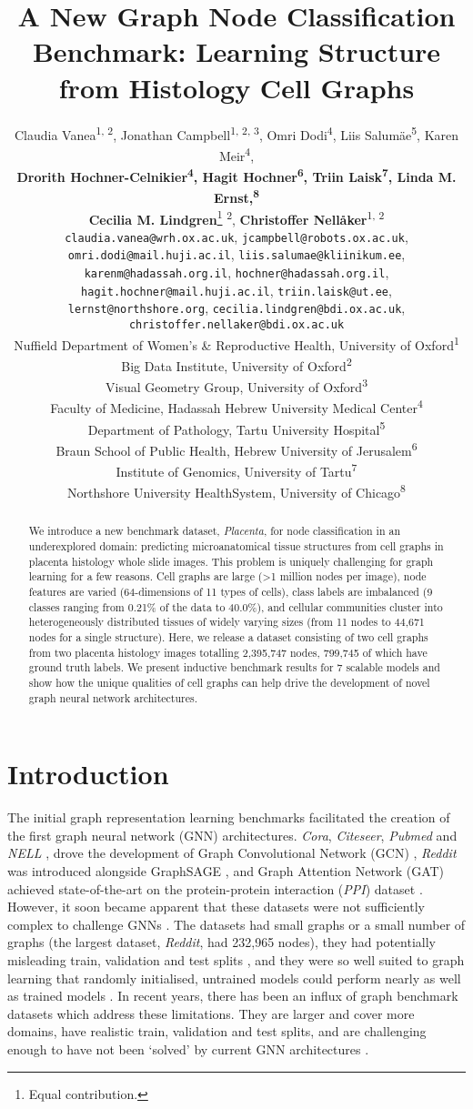 \documentclass{article}
\title{A New Graph Node Classification Benchmark: Learning Structure from Histology Cell Graphs}
\author{Claudia Vanea\textsuperscript{1, 2}, 
  Jonathan Campbell\textsuperscript{1, 2, 3}, 
  Omri Dodi\textsuperscript{4}, 
  Liis Salumäe\textsuperscript{5}, 
  Karen Meir\textsuperscript{4},\\
  \textbf{Drorith Hochner-Celnikier\textsuperscript{4}, 
  Hagit Hochner\textsuperscript{6}, 
  Triin Laisk\textsuperscript{7}, 
  Linda M. Ernst,\textsuperscript{8}}\\
  \textbf{Cecilia M. Lindgren}\thanks{Equal contribution.}  \textsuperscript{2}, 
  \textbf{Christoffer Nellåker}\footnotemark[1]  \textsuperscript{1, 2}\\
  \texttt{claudia.vanea@wrh.ox.ac.uk}, 
  \texttt{jcampbell@robots.ox.ac.uk},\\
  \texttt{omri.dodi@mail.huji.ac.il},
  \texttt{liis.salumae@kliinikum.ee},\\ 
  \texttt{karenm@hadassah.org.il}, 
  \texttt{hochner@hadassah.org.il},\\
  \texttt{hagit.hochner@mail.huji.ac.il}, 
  \texttt{triin.laisk@ut.ee},\\
  \texttt{lernst@northshore.org},
  \texttt{cecilia.lindgren@bdi.ox.ac.uk},\\
  \texttt{christoffer.nellaker@bdi.ox.ac.uk}\\
  Nuffield Department of Women's \& Reproductive Health, University of Oxford\textsuperscript{1}\\
  Big Data Institute, University of Oxford\textsuperscript{2}\\
  Visual Geometry Group, University of Oxford\textsuperscript{3}\\
  Faculty of Medicine, Hadassah Hebrew University Medical Center\textsuperscript{4}\\
  Department of Pathology, Tartu University Hospital\textsuperscript{5}\\
  Braun School of Public Health, Hebrew University of Jerusalem\textsuperscript{6}\\
  Institute of Genomics, University of Tartu\textsuperscript{7}\\
  Northshore University HealthSystem, University of Chicago\textsuperscript{8}
}
\begin{document}
\maketitle


\begin{abstract}
We introduce a new benchmark dataset, \emph{Placenta}, for node classification in an underexplored domain: predicting microanatomical tissue structures from cell graphs in placenta histology whole slide images. This problem is uniquely challenging for graph learning for a few reasons. Cell graphs are large (>1 million nodes per image), node features are varied (64-dimensions of 11 types of cells), class labels are imbalanced (9 classes ranging from 0.21\% of the data to 40.0\%), and cellular communities cluster into heterogeneously distributed tissues of widely varying sizes (from 11 nodes to 44,671 nodes for a single structure). Here, we release a dataset consisting of two cell graphs from two placenta histology images totalling 2,395,747 nodes, 799,745 of which have ground truth labels. We present inductive benchmark results for 7 scalable models and show how the unique qualities of cell graphs can help drive the development of novel graph neural network architectures.
\end{abstract}


\section{Introduction}

The initial graph representation learning benchmarks facilitated the creation of the first graph neural network (GNN) architectures. \emph{Cora}, \emph{Citeseer}, \emph{Pubmed} and \emph{NELL} \cite{yang_revisiting_2016}, \cite{carlson_toward_2010} drove the development of Graph Convolutional Network (GCN) \cite{kipf_semi-supervised_2017}, \emph{Reddit} was introduced alongside GraphSAGE \cite{hamilton_inductive_2017}, and Graph Attention Network (GAT) \cite{velickovic_graph_2018} achieved state-of-the-art on the protein-protein interaction (\emph{PPI}) dataset \cite{zitnik_predicting_2017}. However, it soon became apparent that these datasets were not sufficiently complex to challenge GNNs \cite{hu_open_2021, wu_simplifying_2019}. The datasets had small graphs or a small number of graphs (the largest dataset, \emph{Reddit}, had 232,965 nodes), they had potentially misleading train, validation and test splits \cite{shchur_pitfalls_2019}, and they were so well suited to graph learning that randomly initialised, untrained models could perform nearly as well as trained models \cite{velickovic_deep_2018}. In recent years, there has been an influx of graph benchmark datasets which address these limitations. They are larger and cover more domains, have realistic train, validation and test splits, and are challenging enough to have not been ‘solved’ by current GNN architectures \cite{hu_open_2021,chiang_cluster-gcn_2019,szklarczyk_string_2019}. 
\end{document}
